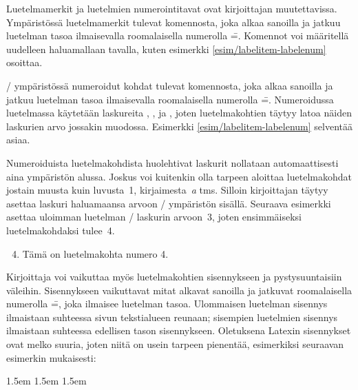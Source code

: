 Luetelmamerkit ja luetelmien numerointitavat ovat kirjoittajan
muutettavissa. Ympäristössä  luetelmamerkit tulevat
komennosta, joka alkaa sanoilla  ja jatkuu
luetelman tasoa ilmaisevalla roomalaisella numerolla
\==. Komennot voi määritellä uudelleen haluamallaan
tavalla, kuten esimerkki \ref{esim/labelitem-labelenum} osoittaa.

\-/ ympäristössä numeroidut kohdat tulevat
komennosta, joka alkaa sanoilla  ja jatkuu
luetelman tasoa ilmaisevalla roomalaisella numerolla
\==. Numeroidussa luetelmassa käytetään laskureita
, ,  ja
, joten luetelmakohtien täytyy latoa näiden laskurien
arvo jossakin muodossa. Esimerkki \ref{esim/labelitem-labelenum}
selventää asiaa.

Numeroiduista luetelmakohdista huolehtivat laskurit nollataan
automaattisesti aina ympäristön alussa. Joskus voi kuitenkin olla
tarpeen aloittaa luetelmakohdat jostain muusta kuin luvusta~1,
kirjaimesta~\textit{a} tms. Silloin kirjoittajan täytyy asettaa laskuri
haluamaansa arvoon \-/ ympäristön sisällä. Seuraava
esimerkki asettaa uloimman luetelman \-/ laskurin
arvoon~3, joten ensimmäiseksi luetelmakohdaksi tulee~4.

\begin{koodilohkosis}
\begin{enumerate}
  \setcounter{enumi}{3}
\item Tämä on luetelmakohta numero 4.
\end{enumerate}
\end{koodilohkosis}

Kirjoittaja voi vaikuttaa myös luetelmakohtien sisennykseen ja
pystysuuntaisiin väleihin. Sisennykseen vaikuttavat mitat alkavat
sanoilla  ja jatkuvat roomalaisella numerolla
\==, joka ilmaisee luetelman tasoa. Ulommaisen
luetelman sisennys ilmaistaan suhteessa sivun tekstialueen reunaan;
sisempien luetelmien sisennys ilmaistaan suhteessa edellisen tason
sisennykseen. Oletuksena Latexin sisennykset ovat melko suuria, joten
niitä on usein tarpeen pienentää, esimerkiksi seuraavan esimerkin
mukaisesti:

\begin{koodilohkosis}
\setlength{\leftmargini}  {1.5em} %
\setlength{\leftmarginii} {1.5em}
\setlength{\leftmarginiii}{1.5em}
\setlength{\leftmarginiv} {1.5em}
\end{koodilohkosis}

